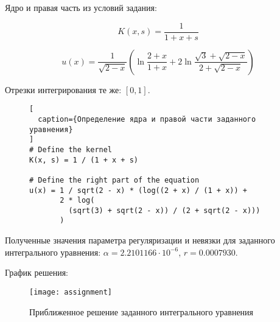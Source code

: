 Ядро и правая часть из условий задания:

\begin{equation}
  K(x, s) = \frac{1}{1 + x + s}
\end{equation}

\begin{equation}
  u(x) = \frac{1}{\sqrt{2 - x}} \left( \ln{\frac{2 + x}{1 + x}} + 2 \ln{\frac{\sqrt{3} + \sqrt{2 - x}}{2 + \sqrt{2 - x}}} \right)
\end{equation}

Отрезки интегрирования те же: $ [0, 1] $.

\newpage

\captionsetup{justification=justified}

\begin{figure}[h!]
\begin{lstlisting}[
  caption={Определение ядра и правой части заданного уравнения}
]
# Define the kernel
K(x, s) = 1 / (1 + x + s)

# Define the right part of the equation
u(x) = 1 / sqrt(2 - x) * (log((2 + x) / (1 + x)) +
       2 * log(
         (sqrt(3) + sqrt(2 - x)) / (2 + sqrt(2 - x)))
       )
\end{lstlisting}
\end{figure}

Полученные значения параметра регуляризации и невязки для заданного интегрального уравнения: $ \alpha = 2.2101166 \cdot 10^{-6} $,
$r = 0.0007930 $. \npar

График решения:

\captionsetup{justification=centering}

\begin{figure}[h!]
  \centering
  \texttt{[image: assignment]}
  \caption{Приближенное решение заданного интегрального уравнения}
\end{figure}


